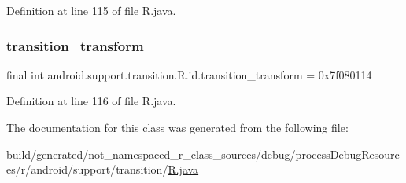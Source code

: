 Definition at line 115 of file R.\+java.

\mbox{\label{classandroid_1_1support_1_1transition_1_1_r_1_1id_a262eee6539d89b6200234e0c27e5d384}} 
\subsubsection{\texorpdfstring{transition\_transform}{transition\_transform}}
{\footnotesize\ttfamily final int android.\+support.\+transition.\+R.\+id.\+transition\+\_\+transform = 0x7f080114\hspace{0.3cm}{\ttfamily [static]}}



Definition at line 116 of file R.\+java.



The documentation for this class was generated from the following file\+:\begin{DoxyCompactItemize}
\item 
build/generated/not\+\_\+namespaced\+\_\+r\+\_\+class\+\_\+sources/debug/process\+Debug\+Resources/r/android/support/transition/\mbox{\hyperlink{android_2support_2transition_2_r_8java}{R.\+java}}\end{DoxyCompactItemize}
